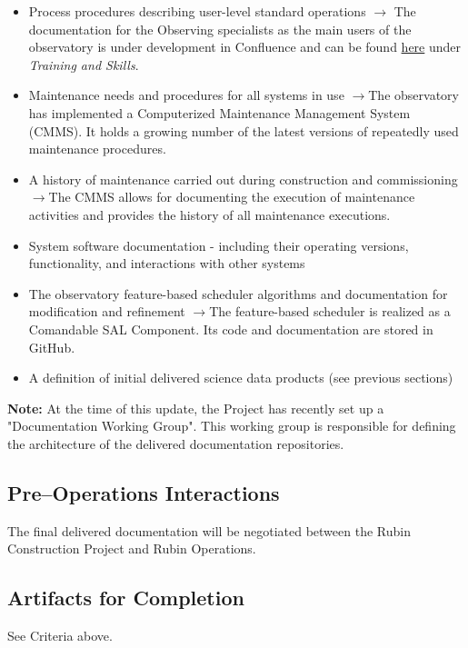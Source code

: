 \begin{itemize}
	\item Process procedures describing user-level standard operations\newline
	$\rightarrow$ The documentation for the Observing specialists as the main users of the observatory is under development in Confluence and can be found \href{https://rubinobs.atlassian.net/wiki/spaces/OST/overview}{here} under \textit{Training and Skills}.

	\item Maintenance needs and procedures for all systems in use\newline
	$\rightarrow$The observatory has implemented a Computerized Maintenance Management System (CMMS).
	It holds a growing number of the latest versions of repeatedly used maintenance procedures.

	\item A history of maintenance carried out during construction and commissioning\newline
	$\rightarrow$The CMMS allows for documenting the execution of maintenance activities and provides the history of all maintenance executions.

	\item System software documentation - including their operating versions, functionality, and interactions with other systems

	\item The observatory feature-based scheduler algorithms and documentation for modification and refinement\newline
	$\rightarrow$The feature-based scheduler is realized as a Comandable SAL Component. Its code and documentation are stored in GitHub.

	\item A definition of initial delivered science data products (see previous sections)
\end{itemize}

{\bf Note:} At the time of this update, the Project has recently set up a "Documentation Working Group".  This working group is responsible for defining the architecture of the delivered documentation repositories.

\subsection{Pre--Operations Interactions}

The final delivered documentation will be negotiated between the Rubin Construction Project and Rubin Operations.

\subsection{Artifacts for Completion}

See Criteria above.

